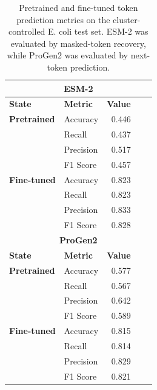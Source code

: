 \begin{table}[t]
\centering
\caption{Pretrained and fine-tuned token prediction metrics on the cluster-controlled E. coli test set. ESM-2 was evaluated by masked-token recovery, while ProGen2 was evaluated by next-token prediction.}
\label{tab:ecoli_token_prediction_metrics_cluster95}
\begin{tabular}{llrrr}
\hline
\multicolumn{5}{c}{\textbf{ESM-2}} \\
\hline
\textbf{State} & \textbf{Metric} & \textbf{Value} & & \\
\hline
\textbf{Pretrained} & Accuracy  & 0.446 & & \\
 & Recall    & 0.437 & & \\
 & Precision & 0.517 & & \\
 & F1 Score  & 0.457 & & \\
\hline
\textbf{Fine-tuned} & Accuracy  & 0.823 & & \\
 & Recall    & 0.823 & & \\
 & Precision & 0.833 & & \\
 & F1 Score  & 0.828 & & \\
\hline
\multicolumn{5}{c}{\textbf{ProGen2}} \\
\hline
\textbf{State} & \textbf{Metric} & \textbf{Value} & & \\
\hline
\textbf{Pretrained} & Accuracy  & 0.577 & & \\
 & Recall    & 0.567 & & \\
 & Precision & 0.642 & & \\
 & F1 Score  & 0.589 & & \\
\hline
\textbf{Fine-tuned} & Accuracy  & 0.815 & & \\
 & Recall    & 0.814 & & \\
 & Precision & 0.829 & & \\
 & F1 Score  & 0.821 & & \\
\hline
\end{tabular}
\end{table}
